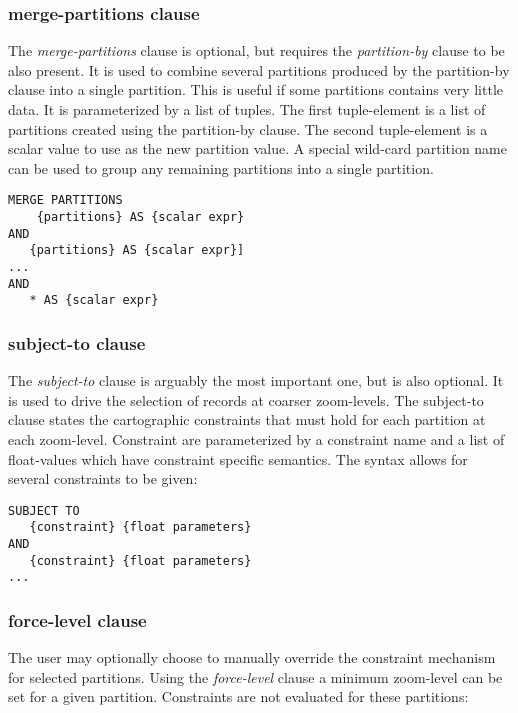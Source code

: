 \subsubsection{merge-partitions clause}

The \emph{merge-partitions} clause is optional, but requires the \emph{partition-by} clause to be also present. It is used to combine several partitions produced by the partition-by clause into a single partition. This is useful if some partitions contains very little data. It is parameterized by a list of tuples. The first tuple-element is a list of partitions created using the partition-by clause. The second tuple-element is a scalar value to use as the new partition value. A special wild-card partition name can be used to group any remaining partitions into a single partition.

\begin{lstlisting}
MERGE PARTITIONS    
    {partitions} AS {scalar expr}
AND 
   {partitions} AS {scalar expr}]
...
AND 
   * AS {scalar expr}
\end{lstlisting}

\subsubsection{subject-to clause}

The \emph{subject-to} clause is arguably the most important one, but is also optional. It is used to drive the selection of records at coarser zoom-levels. The subject-to clause states the cartographic constraints that must hold for each partition at each zoom-level. Constraint are parameterized by a constraint name and a list of float-values which have constraint specific semantics. The syntax allows for several constraints to be given:

\begin{lstlisting}
SUBJECT TO 
   {constraint} {float parameters} 
AND
   {constraint} {float parameters}
...
\end{lstlisting}

\subsubsection{force-level clause}

The user may optionally choose to manually override the constraint mechanism for selected partitions. Using the \emph{force-level} clause a minimum zoom-level can be set for a given partition. Constraints are not evaluated for these partitions:

